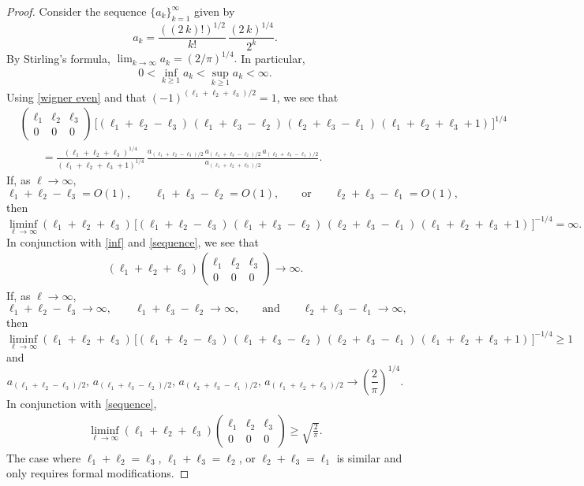 \documentclass[11pt]{amsart}
\theoremstyle {definition}
\begin{document}
\begin{appendices}
\begin{proof}
	Consider the sequence $\{a_k\}_{k=1}^\infty$ given by
	$$
	a_k= \frac{((2\,k)!)^{1/2}}{k!}\,\frac{(2\,k)^{1/4}}{2^k}.
	$$	
	By Stirling's formula, 
	$
	\lim_{k\to\infty}	a_k=(2/\pi)^{1/4}.
	$
	In particular, 
	\begin{align} \label{inf} 
		0<	\inf_{k\geq 1}a_k<\sup_{k\geq 1} a_k<\infty.
	\end{align}
	Using \eqref{wigner even} and that $(-1)^{(\ell_1+\ell_2+\ell_3)/2}=1$, we see that
	\begin{equation}  \label{sequence}
		\begin{aligned} 
			&\begin{pmatrix} \ell_1 & \ell_2 &\ell_3 \\
				0& 0 & 0
			\end{pmatrix} \,\bigg[(\ell_1+\ell_2-\ell_3)\,(\ell_1+\ell_3-\ell_2)\,(\ell_2+\ell_3-\ell_1)\,(\ell_1+\ell_2+\ell_3+1)\,\bigg]^{1/4} \\
			&\qquad =\frac{(\ell_1+\ell_2+\ell_3)^{1/4}}{(\ell_1+\ell_2+\ell_3+1)^{1/4}}\,\frac{a_{(\ell_1+\ell_2-\ell_3)/2}\,a_{(\ell_1+\ell_3-\ell_2)/2}\,a_{(\ell_2+\ell_3-\ell_1)/2}}{a_{(\ell_1+\ell_2+\ell_3)/2}}.
		\end{aligned}
	\end{equation} \indent 
	If, as $\ell\to\infty$, 
	$$
	\ell_1+\ell_2-\ell_3=O(1),\qquad \ell_1+\ell_3-\ell_2=O(1),\qquad\text{or}\qquad \ell_2+\ell_3-\ell_1=O(1),
	$$ then $$
	\liminf_{\ell\to\infty} (\ell_1+\ell_2+\ell_3)\,\big[(\ell_1+\ell_2-\ell_3)\,(\ell_1+\ell_3-\ell_2)\,(\ell_2+\ell_3-\ell_1)\,(\ell_1+\ell_2+\ell_3+1)\,\big]^{-1/4}=\infty.
	$$
	In conjunction with \eqref{inf} and \eqref{sequence}, we see that
	\begin{align*} 
		(\ell_1+\ell_2+\ell_3)\begin{pmatrix} \ell_1 & \ell_2 &\ell_3 \\
			0& 0 & 0
		\end{pmatrix}\to\infty.
	\end{align*} 
	\indent If, as $\ell\to\infty$, 
	$$
	\ell_1+\ell_2-\ell_3\to\infty,\qquad \ell_1+\ell_3-\ell_2\to\infty,\qquad\text{and}\qquad \ell_2+\ell_3-\ell_1\to\infty,
	$$ then 
	$$
	\liminf_{\ell\to\infty} (\ell_1+\ell_2+\ell_3)\,\big[(\ell_1+\ell_2-\ell_3)\,(\ell_1+\ell_3-\ell_2)\,(\ell_2+\ell_3-\ell_1)\,(\ell_1+\ell_2+\ell_3+1)\,\big]^{-1/4}\geq 1
	$$
	and 
	$$
	a_{(\ell_1+\ell_2-\ell_3)/2},\,a_{(\ell_1+\ell_3-\ell_2)/2},\,a_{(\ell_2+\ell_3-\ell_1)/2},\,a_{(\ell_1+\ell_2+\ell_3)/2}\to\left(\frac{2}{\pi}\right)^{1/4}. 
	$$ 
	In conjunction with \eqref{sequence},
	\begin{align*} 
		\liminf_{\ell\to\infty} (\ell_1+\ell_2+\ell_3)\begin{pmatrix} \ell_1 & \ell_2 &\ell_3 \\
			0& 0 & 0
		\end{pmatrix}\geq \sqrt{\frac{2}{\pi}}.
	\end{align*} 
\indent The case where $\ell_1+\ell_2=\ell_3$, $\ell_1+\ell_3=\ell_2$, or $\ell_2+\ell_3=\ell_1$ is similar and only requires formal modifications.


\end{proof}
\end{appendices}
\end{document}
